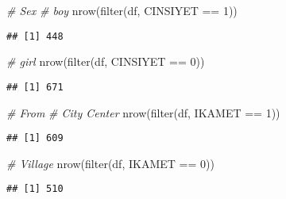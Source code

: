\documentclass[
]{article}
\newenvironment{Shaded}{\begin{snugshade}}{\end{snugshade}}
\newcommand{\CommentTok}[1]{\textcolor[rgb]{0.56,0.35,0.01}{\textit{#1}}}
\newcommand{\DecValTok}[1]{\textcolor[rgb]{0.00,0.00,0.81}{#1}}
\newcommand{\FunctionTok}[1]{\textcolor[rgb]{0.00,0.00,0.00}{#1}}
\newcommand{\NormalTok}[1]{#1}
\newcommand{\SpecialCharTok}[1]{\textcolor[rgb]{0.00,0.00,0.00}{#1}}
\begin{document}
\begin{Shaded}
\begin{Highlighting}[]
\CommentTok{\# Sex}
\CommentTok{\# boy}
\FunctionTok{nrow}\NormalTok{(}\FunctionTok{filter}\NormalTok{(df, CINSIYET }\SpecialCharTok{==} \DecValTok{1}\NormalTok{))}
\end{Highlighting}
\end{Shaded}

\begin{verbatim}
## [1] 448
\end{verbatim}

\begin{Shaded}
\begin{Highlighting}[]
\CommentTok{\# girl}
\FunctionTok{nrow}\NormalTok{(}\FunctionTok{filter}\NormalTok{(df, CINSIYET }\SpecialCharTok{==} \DecValTok{0}\NormalTok{))}
\end{Highlighting}
\end{Shaded}

\begin{verbatim}
## [1] 671
\end{verbatim}

\begin{Shaded}
\begin{Highlighting}[]
\CommentTok{\# From}
\CommentTok{\# City Center}
\FunctionTok{nrow}\NormalTok{(}\FunctionTok{filter}\NormalTok{(df, IKAMET }\SpecialCharTok{==} \DecValTok{1}\NormalTok{))}
\end{Highlighting}
\end{Shaded}

\begin{verbatim}
## [1] 609
\end{verbatim}

\begin{Shaded}
\begin{Highlighting}[]
\CommentTok{\# Village}
\FunctionTok{nrow}\NormalTok{(}\FunctionTok{filter}\NormalTok{(df, IKAMET }\SpecialCharTok{==} \DecValTok{0}\NormalTok{))}
\end{Highlighting}
\end{Shaded}

\begin{verbatim}
## [1] 510
\end{verbatim}

\begin{Shaded}
\end{Shaded}
\end{document}
